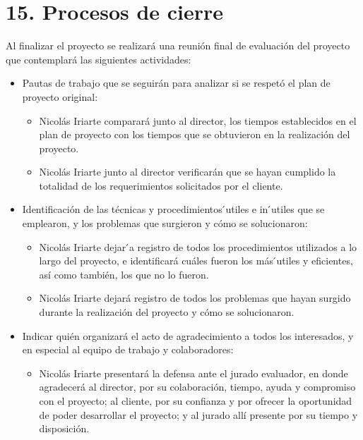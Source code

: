 \section{15. Procesos de cierre}
\label{sec:cierre}

Al finalizar el proyecto se realizará una reunión final de evaluación del proyecto que contemplará
las siguientes actividades:

\begin{itemize}
\item Pautas de trabajo que se seguirán para analizar si se respetó el plan de proyecto original:

  \begin{itemize}
  \item  Nicolás Iriarte comparará junto al director, los tiempos establecidos en el plan de proyecto con los tiempos que se obtuvieron en la realización del proyecto.
  \item Nicolás Iriarte junto al director verificarán que se hayan cumplido la totalidad de los requerimientos solicitados por el cliente.
  \end{itemize}

\item Identificación de las técnicas y procedimientos  ́utiles e in ́utiles que se emplearon, y los problemas que surgieron y cómo se solucionaron:

  \begin{itemize}
  \item Nicolás Iriarte dejar ́a registro de todos los procedimientos utilizados a lo largo del proyecto, e identificará cuáles fueron los más  ́utiles y eficientes, así como también, los que no lo fueron.
  \item Nicolás Iriarte dejará registro de todos los problemas que hayan surgido durante la realización del proyecto y cómo se solucionaron.
  \end{itemize}

\item Indicar quién organizará el acto de agradecimiento a todos los interesados, y en especial al equipo de trabajo y colaboradores:

  \begin{itemize}
  \item Nicolás Iriarte presentará la defensa ante el jurado evaluador, en donde agradecerá al director, por su colaboración, tiempo, ayuda y compromiso con el proyecto; al cliente, por su confianza y por ofrecer la oportunidad de poder desarrollar el proyecto; y al jurado allí presente por su tiempo y disposición.
  \end{itemize}

\end{itemize}








